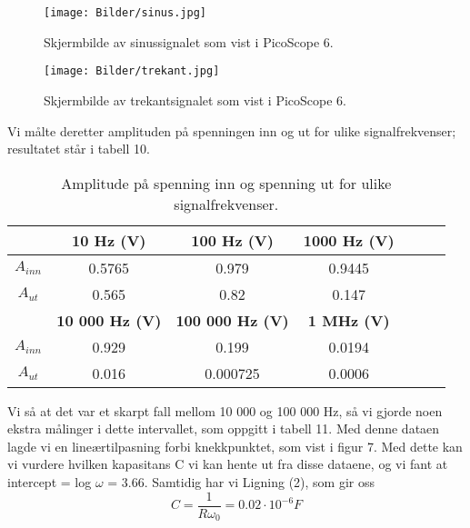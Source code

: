 \documentclass[norsk,a4paper,12pt]{article}
\begin{document}
\begin{figure}
\begin{center}
\texttt{[image: Bilder/sinus.jpg]}\\
\caption{Skjermbilde av sinussignalet som vist i PicoScope 6.}\label{fig:sinus}
\end{center}
\end{figure}

\begin{figure}
\begin{center}
\texttt{[image: Bilder/trekant.jpg]}\\
\caption{Skjermbilde av trekantsignalet som vist i PicoScope 6.}\label{fig:trekant}
\end{center}
\end{figure}


Vi målte deretter amplituden på spenningen inn og ut for ulike signalfrekvenser; resultatet står i tabell 10.

\begin{table}
  \begin{center}
  \caption{Amplitude på spenning inn og spenning ut for ulike signalfrekvenser.}
  \begin{tabular}{|c|c|c|c|c|c|c|} \hline
  \textit{} & \textbf{10 Hz (V)} & \textbf{100 Hz (V)} & \textbf{1000 Hz (V)} \\ \hline
  \textbf{$A_{inn}$} & 0.5765 & 0.979 & 0.9445 \\ \hline
  \textbf{$A_{ut}$} & 0.565 & 0.82 & 0.147  \\ \hline
  \textit{}  & \textbf{10 000 Hz (V)} & \textbf{100 000 Hz (V)} & \textbf{1 MHz (V)} \\ \hline
  \textbf{$A_{inn}$}  & 0.929 & 0.199 & 0.0194 \\ \hline
  \textbf{$A_{ut}$} & 0.016 & 0.000725 & 0.0006 \\ \hline
  \end{tabular}
  \end{center}
  \label{tab:amplitude}
\end{table}

Vi så at det var et skarpt fall mellom 10 000 og 100 000 Hz, så vi gjorde noen ekstra målinger i dette intervallet, som oppgitt i tabell 11. Med denne dataen lagde vi en lineærtilpasning forbi knekkpunktet, som vist i figur 7. Med dette kan vi vurdere hvilken kapasitans C vi kan hente ut fra disse dataene, og vi fant at intercept = log $\omega$ = 3.66. Samtidig har vi Ligning (2), som gir oss
\[C = \frac{1}{R\omega_0} = 0.02 \cdot 10^{-6} F\]
\end{document}
